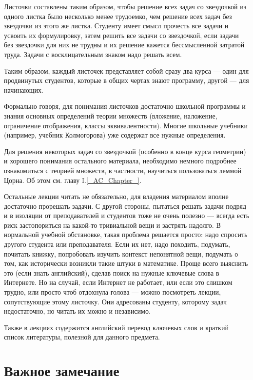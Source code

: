 \documentclass[12pt]{book}
\theoremstyle{upshape}
\theoremstyle{generic}
\theoremstyle{upshapenonumber}
\newcommand{\следствие}{%
     \refstepcounter{teorema}
     {\noindent\bf Следствие \thechapter.\arabic{teorema}:\ }}
\newcommand{\пример}{%
     \refstepcounter{teorema}
     {\noindent\bf Пример \thechapter.\arabic{teorema}:\ }}
\newcommand{\лемма}{%
     \refstepcounter{teorema}
     {\noindent\bf Лемма \thechapter.\arabic{teorema}:\ }}
\newcommand{\теорема}{%
     \refstepcounter{teorema}
     {\noindent\bf Теорема \thechapter.\arabic{teorema}:\ }}
\newcommand{\утверждение}{%
     \refstepcounter{teorema}
     {\noindent\bf Утверждение \thechapter.\arabic{teorema}:\ }}
\begin{document}
Листочки составлены
таким образом, чтобы решение всех задач
со звездочкой из одного листка было
несколько менее трудоемко, чем решение
всех задач без звездочки из этого же листка.
Студенту имеет смысл прочесть все задачи
и усвоить их формулировку, затем решить
все задачи со звездочкой, если задачи
без звездочки для них не трудны и их
решение кажется бессмысленной
затратой труда. Задачи с восклицательным
знаком надо решать всем.

Таким образом, каждый листочек представляет
собой сразу два курса --- один для продвинутых
студентов, которые в общих чертах знают
программу, другой --- для начинающих.

Формально говоря,
для понимания листочков достаточно школьной
программы и знания основных определений
теории множеств (вложение, наложение,
ограничение отображения, классы эквивалентности).
Многие школьные учебники (например, учебник
Колмогорова) уже содержат все нужные
определения. 

Для решения некоторых задач со звездочкой
(особенно в конце курса геометрии) и хорошего 
понимания остального материала, необходимо
немного подробнее ознакомиться с теорией множеств,
в частности, научиться пользоваться 
леммой Цорна. Об этом см. главу
I.\ref{_AC_Chapter_}.

Остальные лекции читать
не обязательно, для владения материалом вполне 
достаточно прорешать задачи. С другой стороны, пытаться
решать задачи подряд и в изоляции от преподавателей
и студентов тоже не очень полезно --- всегда есть
риск застопориться на какой-то тривиальной 
вещи и застрять надолго. В нормальной учебной
обстановке, такая проблема решается просто:
надо спросить другого студента или преподавателя.
Если их нет, надо походить, подумать, почитать
книжку, попробовать изучить контекст непонятной
вещи, подумать о том, как исторически возникли
такие штуки в математике. Проще всего выяснить
это (если знать английский), сделав поиск
на нужные ключевые слова в Интернете.
Но на случай, если Интернет не работает,
или если это слишком трудно, или просто
чтоб отдохнула голова --- можно посмотреть
лекции, сопутствующие этому листочку. Они адресованы
студенту, которому задач недостаточно, но
читать их можно и независимо.

Также в лекциях содержится английский
перевод ключевых слов и краткий список 
литературы, полезной для данного 
предмета.


\section{Важное замечание}
\end{document}
